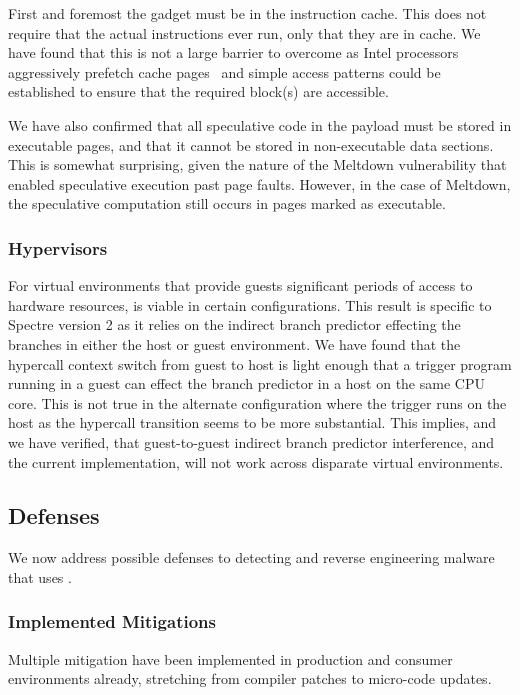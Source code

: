 First and foremost the gadget must be in the instruction cache. 
This does not require that the actual instructions ever run,
 only that they are in cache. We have 
found that this is not a large barrier to overcome as Intel 
processors aggressively prefetch cache pages~\cite{measuring-cache}
and simple access patterns could be established to ensure
that the required block(s) are accessible. 

We have also confirmed that all speculative code in the payload must be
stored in executable pages, and that it cannot be stored in non-executable data
sections. This is somewhat surprising, given the nature of the Meltdown
vulnerability that enabled speculative execution past page faults. However, in
the case of Meltdown, the speculative computation still occurs in pages marked
as executable.



\subsubsection{Hypervisors}
For virtual environments that provide guests significant periods of access to
hardware resources, \speculake is viable in certain configurations. 
This result is specific to Spectre version 2 as it relies on 
the indirect branch predictor effecting the branches in either the host 
or guest environment. We have found that the hypercall context switch from 
guest to host is light enough that a trigger program running in a guest
can effect the branch predictor in a host on the same CPU core. This is not
true in the alternate configuration where the trigger runs on the host as the 
hypercall transition seems to be more substantial. This implies, and we have verified,
that guest-to-guest indirect branch predictor interference, and the current
\speculake implementation, will not work across disparate virtual environments.

\subsection{Defenses}
We now address possible defenses to detecting and reverse engineering malware that uses
\speculake. 
\subsubsection{Implemented Mitigations}
Multiple mitigation have been implemented in production and consumer environments
already, stretching from compiler patches to micro-code updates.

